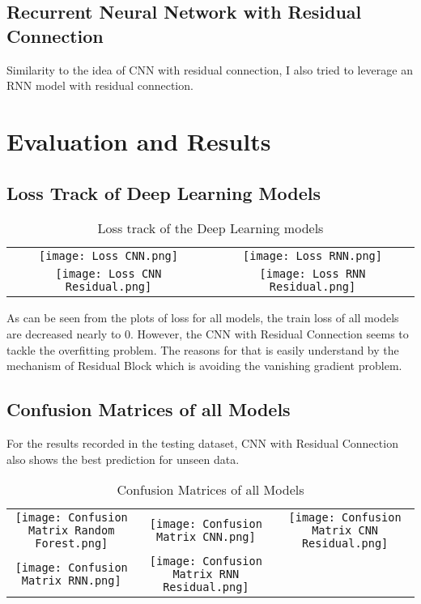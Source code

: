\documentclass{article}
\begin{document}
\subsection{Recurrent Neural Network with Residual Connection}
Similarity to the idea of CNN with residual connection, 
I also tried to leverage an RNN model with residual connection.

\section{Evaluation and Results}

\subsection{Loss Track of Deep Learning Models}
\begin{table}[h]
\centering
\begin{tabular}{cc}
\texttt{[image: Loss CNN.png]} & \texttt{[image: Loss RNN.png]} \\
\texttt{[image: Loss CNN Residual.png]} & \texttt{[image: Loss RNN Residual.png]} \\    
\end{tabular}
\caption{Loss track of the Deep Learning models}
\end{table}
As can be seen from the plots of loss for all models, the train loss of all models are decreased nearly to 0.
However, the CNN with Residual Connection seems to tackle the overfitting problem.
The reasons for that is easily understand by the mechanism of Residual Block which is avoiding the vanishing gradient problem.

\subsection{Confusion Matrices of all Models}
For the results recorded in the testing dataset, CNN with Residual Connection also shows the best prediction for unseen data.
\begin{table}[h]
\centering
\begin{tabular}{ccc}
\texttt{[image: Confusion Matrix Random Forest.png]} & \texttt{[image: Confusion Matrix CNN.png]} & \texttt{[image: Confusion Matrix CNN Residual.png]} \\
\texttt{[image: Confusion Matrix RNN.png]} & \texttt{[image: Confusion Matrix RNN Residual.png]} & \\
\end{tabular}
\caption{Confusion Matrices of all Models}
\end{table}
 
\end{document}
